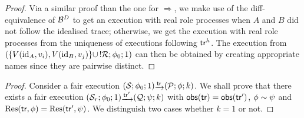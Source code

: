 \begin{proof}
Via a similar proof than the one for $\Rightarrow$,
we make use of the diff-equivalence of $\mathcal{B}^D$ to get an execution with real role processes when $A$ and $B$ did not
follow the idealised trace; otherwise, we get the execution with real role processes from the uniqueness of executions following
$\mathsf{tr}^h$. The execution from $(\{V(\mathrm{id}_A,v_i),V(\mathrm{id}_B,v_j)\}\cup\,!\mathcal{R};\phi_0;1)$ can then
be obtained by creating appropriate names since they are pairwise distinct.  
\end{proof}


\mainTheorem*
\begin{proof}
Consider a fair execution $(\S;\phi_0;1)\sint{\tr}(\p;\phi;k)$. We shall prove that
there exists a fair execution $(\S_r;\phi_0;1)\sint{\tr'}(\q;\psi;k)$ with
$\mathsf{obs}(\mathsf{tr})=\mathsf{obs}(\mathsf{tr}')$, $\phi\sim\psi$ and $\mathrm{Res}(\mathsf{tr},\phi)=\mathrm{Res}(\mathsf{tr}',\psi)$.
We distinguish two cases whether $k=1$ or not.


\end{proof}
